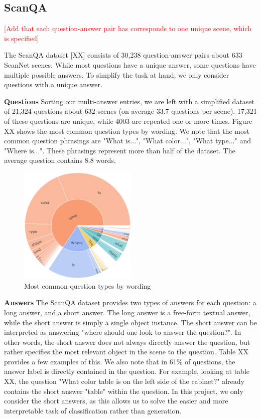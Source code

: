 \subsection{ScanQA}

\textcolor{red}{[Add that each question-answer pair has corresponds to one unique scene, which is specified]}

The ScanQA dataset [XX] consists of 30,238 question-answer pairs about 633 ScanNet scenes. While most questions have a unique answer, some questions have multiple possible answers. To simplify the task at hand, we only consider questions with a unique answer.

\bigskip
\noindent \textbf{Questions}
Sorting out multi-answer entries, we are left with a simplified dataset of 21,324 questions about 632 scenes (on average 33.7 questions per scene). 17,321 of these questions are unique, while 4003 are repeated one or more times. Figure XX shows the most common question types by wording. We note that the most common question phrasings are "What is...", "What color...", "What type..." and "Where is...". These phrasings represent more than half of the dataset. The average question contains 8.8 words.

\begin{figure}[h!]
    \centering
    \includegraphics[width=0.5\textwidth]{images/sunburst_high_dpi.png}
    \caption{Most common question types by wording}
    \label{fig:your_label}
\end{figure}


\bigskip
\noindent \textbf{Answers}
The ScanQA dataset provides two types of answers for each question: a long answer, and a short answer. The long answer is a free-form textual answer, while the short answer is simply a single object instance. The short answer can be interpreted as answering "where should one look to answer the question?". In other words, the short answer does not always directly answer the question, but rather specifies the most relevant object in the scene to the question. Table XX provides a few examples of this. We also note that in 61$\%$ of questions, the answer label is directly contained in the question. For example, looking at table XX, the question "What color table is on the left side of the cabinet?" already contains the short answer "table" within the question. In this project, we only consider the short answers, as this allows us to solve the easier and more interpretable task of classification rather than generation.

